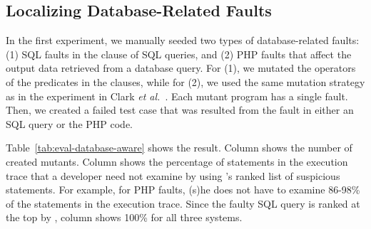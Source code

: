 \subsection{Localizing Database-Related Faults}



In the first experiment, we manually 
seeded two types of database-related faults: (1) SQL faults in the
 clause of SQL queries, and (2) PHP faults that affect
the output data
retrieved from a database query. For (1), we mutated the operators of
the predicates in the  clauses, while for (2), we used
the same mutation strategy as in the experiment in Clark {\em et
al.}~\cite{ga-ase11}. Each mutant program has a single fault. Then, we
created a failed test case that was resulted from the fault in either
an SQL query or the PHP code.

Table~\ref{tab:eval-database-aware} shows the result. Column
 shows the number of created mutants.  Column  shows the percentage of statements in the execution
trace that a developer need not examine by using \tool{}'s ranked list of
suspicious statements. For example, for PHP faults, (s)he does not
have to examine 86-98\% of the statements in the execution
trace. Since the faulty SQL query is ranked at the top by \tool{},
column  shows 100\% for all three systems.

